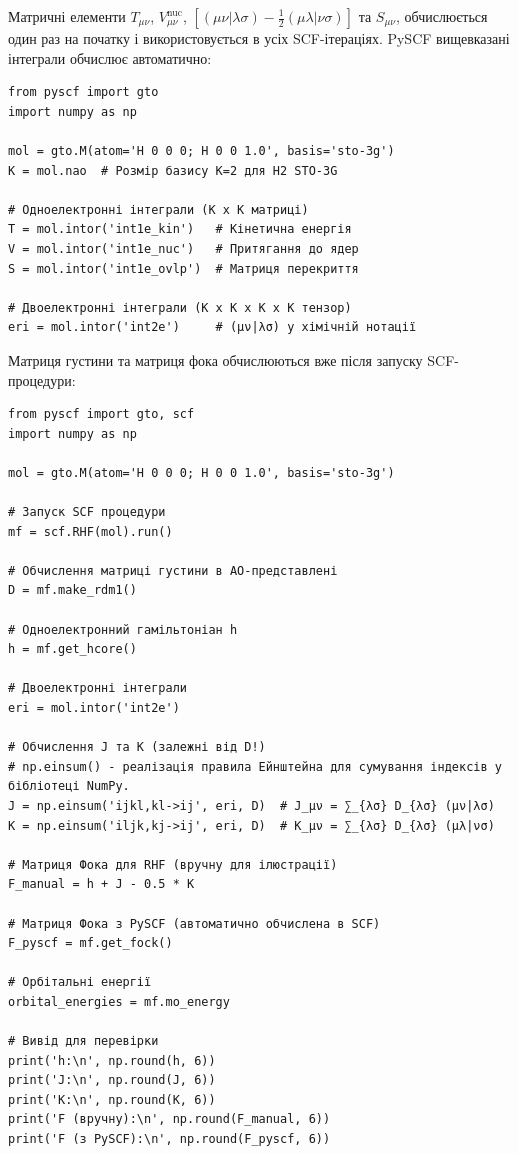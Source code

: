 Матричні елементи $T_{\mu\nu}$, $V^{\text{nuc}}_{\mu\nu}$, $\left[ (\mu\nu|\lambda\sigma) - \tfrac{1}{2} (\mu\lambda|\nu\sigma) \right]$ та ${S}_{\mu\nu}$, обчислюється один раз на початку і використовується в усіх SCF-ітераціях.
PySCF вищевказані інтеграли обчислює автоматично:

\begin{verbatim}
from pyscf import gto
import numpy as np

mol = gto.M(atom='H 0 0 0; H 0 0 1.0', basis='sto-3g')
K = mol.nao  # Розмір базису K=2 для H2 STO-3G

# Одноелектронні інтеграли (K x K матриці)
T = mol.intor('int1e_kin')   # Кінетична енергія
V = mol.intor('int1e_nuc')   # Притягання до ядер
S = mol.intor('int1e_ovlp')  # Матриця перекриття

# Двоелектронні інтеграли (K x K x K x K тензор)
eri = mol.intor('int2e')     # (μν|λσ) у хімічній нотації
\end{verbatim}

Матриця густини та матриця фока обчислюються вже після запуску SCF-процедури:
\begin{verbatim}
from pyscf import gto, scf
import numpy as np

mol = gto.M(atom='H 0 0 0; H 0 0 1.0', basis='sto-3g')

# Запуск SCF процедури
mf = scf.RHF(mol).run()

# Обчислення матриці густини в АО-представлені
D = mf.make_rdm1()

# Одноелектронний гамільтоніан h
h = mf.get_hcore()

# Двоелектронні інтеграли
eri = mol.intor('int2e')

# Обчислення J та K (залежні від D!)
# np.einsum() - реалізація правила Ейнштейна для сумування індексів у бібліотеці NumPy.
J = np.einsum('ijkl,kl->ij', eri, D)  # J_μν = ∑_{λσ} D_{λσ} (μν|λσ)
K = np.einsum('iljk,kj->ij', eri, D)  # K_μν = ∑_{λσ} D_{λσ} (μλ|νσ)

# Матриця Фока для RHF (вручну для ілюстрації)
F_manual = h + J - 0.5 * K

# Матриця Фока з PySCF (автоматично обчислена в SCF)
F_pyscf = mf.get_fock()

# Орбітальні енергії
orbital_energies = mf.mo_energy

# Вивід для перевірки
print('h:\n', np.round(h, 6))
print('J:\n', np.round(J, 6))
print('K:\n', np.round(K, 6))
print('F (вручну):\n', np.round(F_manual, 6))
print('F (з PySCF):\n', np.round(F_pyscf, 6))
\end{verbatim}

